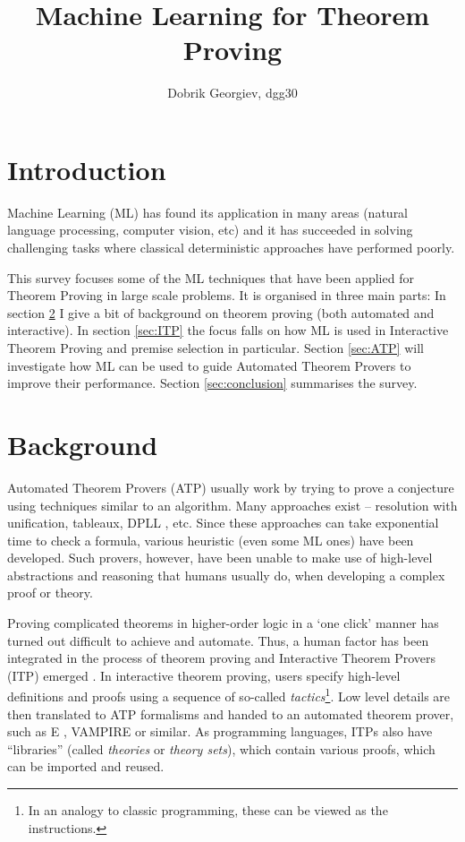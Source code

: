 \documentclass{article}
\title{Machine Learning for Theorem Proving}
\author{Dobrik Georgiev, dgg30}
\begin{document}
\maketitle
\section{Introduction}

Machine Learning (ML) has found its application in many areas (natural language
processing, computer vision, etc) and it has succeeded in solving challenging
tasks where classical deterministic approaches have performed poorly.

This survey focuses some of the ML techniques that have been applied for
Theorem Proving in large scale problems. It is organised in three main parts:
In section \ref{sec:background} I give a bit of background on theorem proving
(both automated and interactive). In section \ref{sec:ITP} the focus falls on
how ML is used in Interactive Theorem Proving and premise selection in
particular. Section \ref{sec:ATP} will investigate how ML can be used to guide
Automated Theorem Provers to improve their performance. Section
\ref{sec:conclusion} summarises the survey.

\nocite{LearningToProveITP}


\section{Background}\label{sec:background}

Automated Theorem Provers (ATP) usually work by trying to prove a conjecture
using techniques similar to an algorithm. Many approaches exist -- resolution
with unification, tableaux, DPLL \citep{DPLL}, etc. Since these approaches can
take exponential time to check a formula, various heuristic (even some ML ones)
have been developed. Such provers, however, have been unable to make use of
high-level abstractions and reasoning that humans usually do, when developing
a complex proof or theory.

Proving complicated theorems in higher-order logic in a `one click' manner has
turned out difficult to achieve and automate. Thus, a human factor has been
integrated in the process of theorem proving and Interactive Theorem Provers
(ITP) emerged \citep{HistoryITP}. In interactive theorem proving, users specify
high-level definitions and proofs using a sequence of so-called
\textit{tactics}\footnote{In an analogy to classic programming, these can be
viewed as the instructions.}. Low level details are then translated to ATP
formalisms and handed to an automated theorem prover, such as
E \citep{Eprover}, VAMPIRE \citep{VAMPIRE} or similar. As programming
languages, ITPs also have ``libraries'' (called \emph{theories} or \emph{theory
sets}), which contain various proofs, which can be imported and reused.
\end{document}
